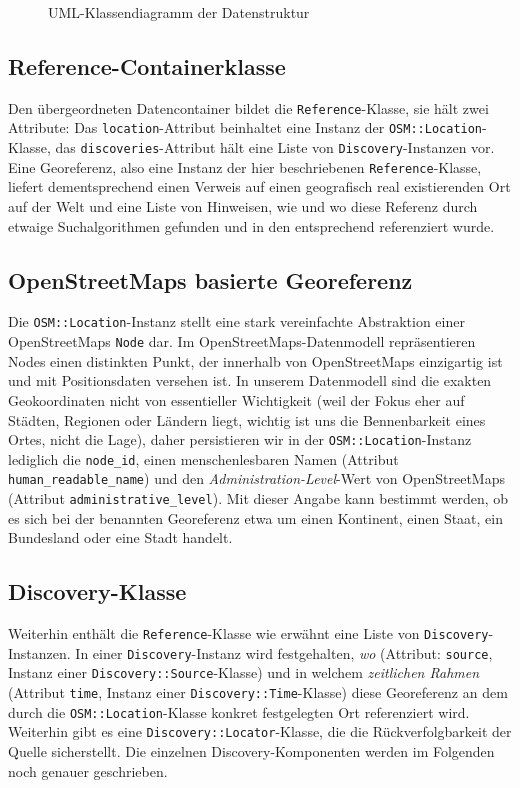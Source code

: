 \begin{figure}[H]
\caption{UML-Klassendiagramm der Datenstruktur}
\end{figure}

\subsection{Reference-Containerklasse}
Den übergeordneten Datencontainer bildet die \texttt{Reference}-Klasse, sie hält zwei Attribute: Das \texttt{location}-Attribut beinhaltet eine Instanz der \texttt{OSM::Location}-Klasse, das \texttt{discoveries}-Attribut hält eine Liste von \texttt{Discovery}-Instanzen vor. Eine Georeferenz, also eine Instanz der hier beschriebenen \texttt{Reference}-Klasse, liefert dementsprechend einen Verweis auf einen geografisch real existierenden Ort auf der Welt und eine Liste von Hinweisen, wie und wo diese Referenz durch etwaige Suchalgorithmen gefunden und in den entsprechend referenziert wurde.

\subsection{OpenStreetMaps basierte Georeferenz}
Die \texttt{OSM::Location}-Instanz stellt eine stark vereinfachte Abstraktion einer OpenStreetMaps \texttt{Node}\cite{OSMnode} dar. Im OpenStreetMaps-Datenmodell repräsentieren Nodes einen distinkten Punkt, der innerhalb von OpenStreetMaps einzigartig ist und mit Positionsdaten versehen ist. In unserem Datenmodell sind die exakten Geokoordinaten nicht von essentieller Wichtigkeit (weil der Fokus eher auf Städten, Regionen oder Ländern liegt, wichtig ist uns die Bennenbarkeit eines Ortes, nicht die Lage), daher persistieren wir in der \texttt{OSM::Location}-Instanz lediglich die \texttt{node\_id}, einen menschenlesbaren Namen (Attribut \texttt{human\_readable\_name}) und den \textit{Administration-Level}-Wert von OpenStreetMaps\cite{OSMadminlevel} (Attribut \texttt{administrative\_level}). Mit dieser Angabe kann bestimmt werden, ob es sich bei der benannten Georeferenz etwa um einen Kontinent, einen Staat, ein Bundesland oder eine Stadt handelt.

\subsection{Discovery-Klasse}
Weiterhin enthält die \texttt{Reference}-Klasse wie erwähnt eine Liste von \texttt{Discovery}-Instanzen. In einer \texttt{Discovery}-Instanz wird festgehalten, \textit{wo} (Attribut: \texttt{source}, Instanz einer \texttt{Discovery::Source}-Klasse) und in welchem \textit{zeitlichen Rahmen} (Attribut \texttt{time}, Instanz einer \texttt{Discovery::Time}-Klasse) diese Georeferenz an dem durch die \texttt{OSM::Location}-Klasse konkret festgelegten Ort referenziert wird. Weiterhin gibt es eine \texttt{Discovery::Locator}-Klasse, die die Rückverfolgbarkeit der Quelle sicherstellt. Die einzelnen Discovery-Komponenten werden im Folgenden noch genauer geschrieben.

